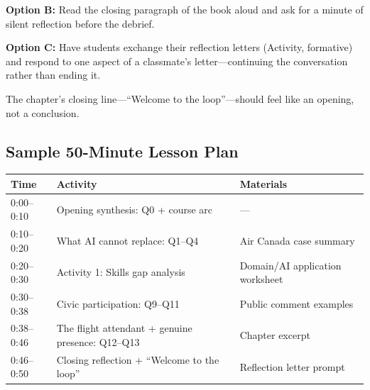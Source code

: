 \textbf{Option B:} Read the closing paragraph of the book aloud and ask for a minute of silent reflection before the debrief.

\textbf{Option C:} Have students exchange their reflection letters (Activity, formative) and respond to one aspect of a classmate's letter---continuing the conversation rather than ending it.

The chapter's closing line---``Welcome to the loop''---should feel like an opening, not a conclusion.

\subsection*{Sample 50-Minute Lesson Plan}

\begin{center}
\begin{tabular}{p{2cm}p{5cm}p{4cm}}
\toprule
\textbf{Time} & \textbf{Activity} & \textbf{Materials} \\
\midrule
0:00--0:10 & Opening synthesis: Q0 + course arc & --- \\
0:10--0:20 & What AI cannot replace: Q1--Q4 & Air Canada case summary \\
0:20--0:30 & Activity 1: Skills gap analysis & Domain/AI application worksheet \\
0:30--0:38 & Civic participation: Q9--Q11 & Public comment examples \\
0:38--0:46 & The flight attendant + genuine presence: Q12--Q13 & Chapter excerpt \\
0:46--0:50 & Closing reflection + ``Welcome to the loop'' & Reflection letter prompt \\
\bottomrule
\end{tabular}
\end{center}

